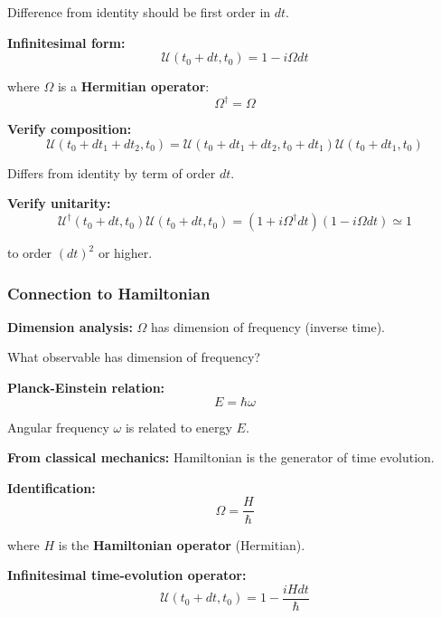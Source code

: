 \documentclass[11pt,a4paper]{article}
\begin{document}
Difference from identity should be first order in $dt$.

\textbf{Infinitesimal form:}
\begin{equation}
\boxed{\mathscr{U}(t_0 + dt, t_0) = 1 - i\Omega dt}
\tag{2.15}
\end{equation}

where $\Omega$ is a \textbf{Hermitian operator}:
\begin{equation}
\Omega^\dagger = \Omega
\tag{2.16}
\end{equation}

\textbf{Verify composition:}
\begin{equation}
\mathscr{U}(t_0 + dt_1 + dt_2, t_0) = \mathscr{U}(t_0 + dt_1 + dt_2, t_0 + dt_1)\mathscr{U}(t_0 + dt_1, t_0)
\tag{2.17}
\end{equation}

Differs from identity by term of order $dt$.

\textbf{Verify unitarity:}
\begin{equation}
\mathscr{U}^\dagger(t_0 + dt, t_0)\mathscr{U}(t_0 + dt, t_0) = (1 + i\Omega^\dagger dt)(1 - i\Omega dt) \simeq 1
\tag{2.18}
\end{equation}

to order $(dt)^2$ or higher.

\subsubsection{Connection to Hamiltonian}

\textbf{Dimension analysis:} $\Omega$ has dimension of frequency (inverse time).

What observable has dimension of frequency?

\textbf{Planck-Einstein relation:}
\begin{equation}
E = \hbar\omega
\tag{2.19}
\end{equation}

Angular frequency $\omega$ is related to energy $E$.

\textbf{From classical mechanics:} Hamiltonian is the generator of time evolution.

\textbf{Identification:}
\begin{equation}
\boxed{\Omega = \frac{H}{\hbar}}
\tag{2.20}
\end{equation}

where $H$ is the \textbf{Hamiltonian operator} (Hermitian).

\textbf{Infinitesimal time-evolution operator:}
\begin{equation}
\boxed{\mathscr{U}(t_0 + dt, t_0) = 1 - \frac{iH dt}{\hbar}}
\tag{2.21}
\end{equation}
\end{document}
